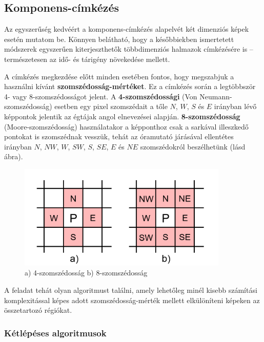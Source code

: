 \subsection{Komponens-címkézés}\label{sect:blob_cimke}

Az egyszerűség kedvéért a komponens-címkézés alapelvét két dimenziós képek esetén mutatom be. Könnyen belátható, hogy a későbbiekben ismertetett módszerek egyszerűen kiterjeszthetők többdimenziós halmazok címkézésére is -- természetesen az idő- és tárigény növekedése mellett.

\bigskip

A címkézés megkezdése előtt minden esetében fontos, hogy megszabjuk a használni kívánt \textbf{szomszédosság-mértéket}. Ez a címkézés során a legtöbbször 4- vagy 8-szomszédosságot jelent. A \textbf{4-szomszédossági} (Von Neumann-szomszédosság) esetben egy pixel szomszédait a tőle $N$, $W$, $S$ és $E$ irányban lévő képpontok jelentik az égtájak angol elnevezései alapján. \textbf{8-szomszédosság} (Moore-szomszédosság) használatakor a képponthoz csak a sarkával illeszkedő pontokat is szomszédnak vesszük, tehát az óramutató járásával ellentétes irányban $N$, $NW$, $W$, $SW$, $S$, $SE$, $E$ és $NE$ szomszédokról beszélhetünk (lásd  ábra).

\begin{figure}[!ht]
\centering
\includegraphics[width=100mm, keepaspectratio]{figures/connectivity.png}
\caption{a) 4-szomszédosság b) 8-szomszédosság}
\label{fig:connectivity}
\end{figure}

A feladat tehát olyan algoritmust találni, amely lehetőleg minél kisebb számítási komplexitással képes adott szomszédosság-mérték mellett elkülöníteni képeken az összetartozó régiókat.

\subsubsection{Kétlépéses algoritmusok}\label{sect:blob_ketlepes}


